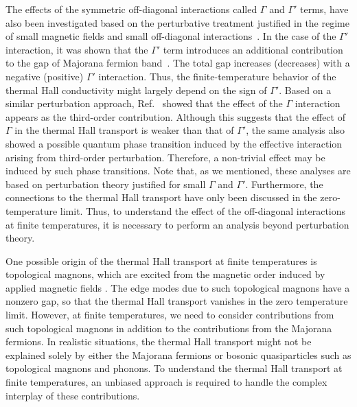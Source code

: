 \documentclass[twocolumn,superscriptaddress,showpacs, longbibliography, aps, prb]{revtex4-2}
\begin{document}
The effects of the symmetric off-diagonal interactions called $\Gamma$ and $\Gamma'$ terms, 
have also been investigated based on the perturbative treatment justified in the %
regime of small magnetic fields 
and small off-diagonal interactions~\cite{TakikawaF2020, YamadaF2021}. 
In the case of the $\Gamma'$ interaction, it was shown that the $\Gamma'$ term introduces 
an additional contribution to the gap of Majorana fermion band~\cite{TakikawaF2020}.
The total gap %
increases (decreases)
with a negative (positive) $\Gamma'$ interaction.
Thus, the finite-temperature behavior of the thermal Hall conductivity might largely depend on the sign of $\Gamma'$. 
Based on %
a similar perturbation approach, Ref.~\cite{YamadaF2021} %
showed that the 
effect of the $\Gamma$ interaction %
appears as the third-order contribution. 
Although %
this suggests that the effect of $\Gamma$ in the thermal Hall transport is %
weaker than that of $\Gamma'$, 
the same analysis also showed a possible quantum phase transition induced by the effective interaction arising from %
third-order perturbation. 
Therefore, a non-trivial effect may be induced by %
such phase transitions.
Note that, as we mentioned, these analyses are based on %
perturbation theory justified for small $\Gamma$ and $\Gamma'$. 
Furthermore, the connections to the thermal Hall transport 
have only been discussed %
in the zero-temperature limit. 
Thus, to understand the effect of the off-diagonal interactions at finite temperatures, it is necessary to perform an analysis beyond %
perturbation theory.

One possible origin of the thermal Hall transport at finite temperatures %
is topological magnons, which are excited from the magnetic order induced by %
applied magnetic fields \cite{McClartyDGRPMP2018,Joshi2018}. 
The edge modes due to such topological magnons %
have
a nonzero gap, %
so that the
thermal Hall transport %
vanishes in the zero temperature limit. 
However, at finite temperatures, we need to consider %
contributions from such topological 
magnons in addition to the contributions from the Majorana fermions. 
In realistic situations, the thermal Hall transport might not be 
explained solely by either the Majorana fermions or bosonic quasiparticles such as topological magnons and phonons.
To understand the thermal Hall transport at %
finite temperatures, 
an unbiased %
approach is required to handle the complex interplay of
these contributions.
\end{document}
